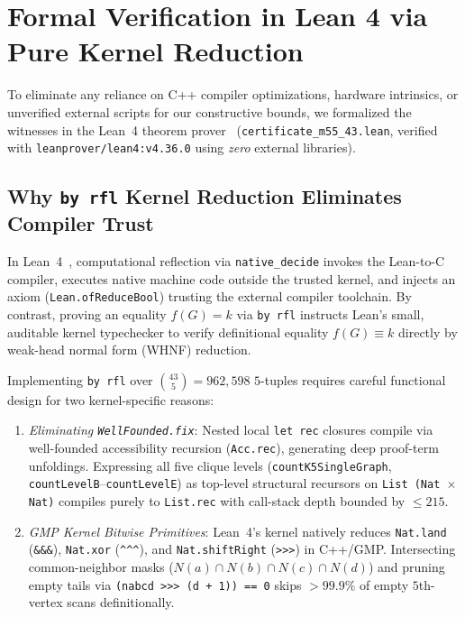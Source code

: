 \documentclass[11pt,a4paper]{article}
\theoremstyle{plain}
\theoremstyle{definition}
\begin{document}
\section{Formal Verification in Lean 4 via Pure Kernel Reduction}
\label{sec:lean4}

To eliminate any reliance on C++ compiler optimizations, hardware intrinsics, or unverified external scripts for our constructive bounds, we formalized the witnesses in the Lean~4 theorem prover~\cite{MouraUllrich2021} (\texttt{certificate\_\allowbreak m55\_\allowbreak 43.lean}, verified with \texttt{leanprover/lean4:v4.36.0} using \emph{zero} external libraries).

\subsection{Why \texttt{by rfl} Kernel Reduction Eliminates Compiler Trust}

In Lean~4~\cite{MouraUllrich2021}, computational reflection via \texttt{native\_decide} invokes the Lean-to-C compiler, executes native machine code outside the trusted kernel, and injects an axiom (\texttt{Lean.ofReduceBool}) trusting the external compiler toolchain. By contrast, proving an equality $f(G) = k$ via \texttt{by rfl} instructs Lean's small, auditable kernel typechecker to verify definitional equality $f(G) \equiv k$ directly by weak-head normal form (WHNF) reduction.

Implementing \texttt{by rfl} over $\binom{43}{5} = 962,598$ $5$-tuples requires careful functional design for two kernel-specific reasons:
\begin{enumerate}
  \item \emph{Eliminating \texttt{WellFounded.fix}}: Nested local \texttt{let rec} closures compile via well-founded accessibility recursion (\texttt{Acc.rec}), generating deep proof-term unfoldings. Expressing all five clique levels (\texttt{countK5SingleGraph}, \texttt{countLevelB}--\texttt{countLevelE}) as top-level structural recursors on \texttt{List (Nat $\times$ Nat)} compiles purely to \texttt{List.rec} with call-stack depth bounded by $\le 215$.
  \item \emph{GMP Kernel Bitwise Primitives}: Lean~4's kernel natively reduces \texttt{Nat.land} (\texttt{\&\&\&}), \texttt{Nat.xor} (\texttt{\textasciicircum\textasciicircum\textasciicircum}), and \texttt{Nat.shiftRight} (\texttt{>>>}) in C++/GMP. Intersecting common-neighbor masks ($N(a) \cap N(b) \cap N(c) \cap N(d)$) and pruning empty tails via \texttt{(nabcd >>> (d + 1)) == 0} skips $>99.9\%$ of empty $5$th-vertex scans definitionally.
\end{enumerate}
\end{document}

